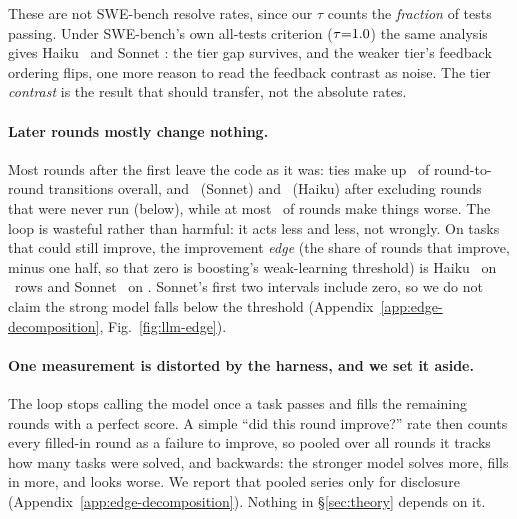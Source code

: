 \documentclass{article}
\theoremstyle{remark}
\theoremstyle{plain}
\begin{document}
These are not SWE-bench resolve rates, since our $\tau$ counts the \emph{fraction} of tests passing. Under SWE-bench's own all-tests criterion ($\tau{=}1.0$) the same analysis gives Haiku \statPBHaikuResolvedRange\ and Sonnet \statPBSonnetResolvedRange: the tier gap survives, and the weaker tier's feedback ordering flips, one more reason to read the feedback contrast as noise. The tier \emph{contrast} is the result that should transfer, not the absolute rates.

\paragraph{Later rounds mostly change nothing.} Most rounds after the first leave the code as it was: ties make up \statPBTieRange\ of round-to-round transitions overall, and \statPBSonnetGenuineTieRange\ (Sonnet) and \statPBHaikuGenuineTieRange\ (Haiku) after excluding rounds that were never run (below), while at most \statPBRegressMax\ of rounds make things worse. The loop is wasteful rather than harmful: it acts less and less, not wrongly. On tasks that could still improve, the improvement \emph{edge} (the share of rounds that improve, minus one half, so that zero is boosting's weak-learning threshold) is Haiku \statPBHaikuEdgeHeadroom\ on \statPBHaikuHeadroomN\ rows and Sonnet \statPBSonnetEdgeHeadroom\ on \statPBSonnetHeadroomN. Sonnet's first two intervals include zero, so we do not claim the strong model falls below the threshold (Appendix~\ref{app:edge-decomposition}, Fig.~\ref{fig:llm-edge}).

\paragraph{One measurement is distorted by the harness, and we set it aside.} The loop stops calling the model once a task passes and fills the remaining rounds with a perfect score. A simple ``did this round improve?'' rate then counts every filled-in round as a failure to improve, so pooled over all rounds it tracks how many tasks were solved, and backwards: the stronger model solves more, fills in more, and looks worse. We report that pooled series only for disclosure (Appendix~\ref{app:edge-decomposition}). Nothing in \S\ref{sec:theory} depends on it.
\end{document}
